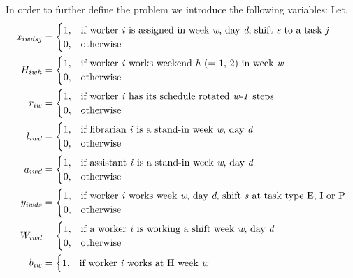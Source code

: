 In order to further define the problem we introduce the following variables: Let,
\begin{align}
    x_{iwdsj}&=
    \begin{cases}
      1, & \text{if worker \textit{i} is assigned in week \textit{w}, day \textit{d}, shift \textit{s} to a task \textit{j}}\\
      0, & \text{otherwise}
    \end{cases}
    \\
    H_{iwh}&=
    \begin{cases}
      1, & \text{if worker \textit{i} works weekend \textit{h} (= 1, 2) in week \textit{w}}\\
      0, & \text{otherwise}
    \end{cases}
	\\
	r_{iw}&=
	\begin{cases}
		1, & \text{if worker \textit{i} has its schedule rotated \textit{w-1} steps}\\
		0, & \text{otherwise}
	\end{cases}
	\\
	l_{iwd}&=
	\begin{cases}
	  1, & \text{if librarian \textit{i} is a stand-in week \textit{w}, day \textit{d}} \\
	  0, & \text{otherwise}
	\end{cases}
	\\
	a_{iwd}&=
	\begin{cases}
 		1, & \text{if assistant \textit{i} is a stand-in week \textit{w}, day \textit{d}} \\
 		0, & \text{otherwise}
	\end{cases}
	\\
	y_{iwds}&=
	\begin{cases}
 		1, & \text{if worker \textit{i} works week \textit{w}, day \textit{d}, shift \textit{s} at task type E, I or P} \\
 		0, & \text{otherwise}
	\end{cases}
	\\
	W_{iwd}&=
	\begin{cases}
	 	1, & \text{if a worker \textit{i} is working a shift week \textit{w}, day \textit{d}} \\
	 	0, & \text{otherwise}
	\end{cases}
	\\
	b_{iw}&=
	\begin{cases}
 		1, & \text{if worker \textit{i} works at H week \textit{w}} \\

\end{cases}
\end{align}
